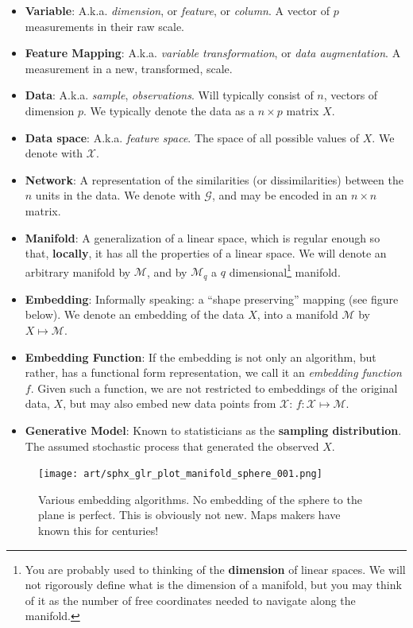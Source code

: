 \documentclass[]{book}
\theoremstyle{definition}
\theoremstyle{definition}
\theoremstyle{definition}
\theoremstyle{remark}
\begin{document}
\begin{itemize}
\item
  \textbf{Variable}:
  A.k.a. \emph{dimension}, or \emph{feature}, or \emph{column}. A vector of \(p\) measurements in their raw scale.
\item
  \textbf{Feature Mapping}:
  A.k.a. \emph{variable transformation}, or \emph{data augmentation}. A measurement in a new, transformed, scale.
\item
  \textbf{Data}:
  A.k.a. \emph{sample}, \emph{observations}.
  Will typically consist of \(n\), vectors of dimension \(p\).
  We typically denote the data as a \(n\times p\) matrix \(X\).
\item
  \textbf{Data space}:
  A.k.a. \emph{feature space}. The space of all possible values of \(X\). We denote with \(\mathcal{X}\).
\item
  \textbf{Network}:
  A representation of the similarities (or dissimilarities) between the \(n\) units in the data. We denote with \(\mathcal{G}\), and may be encoded in an \(n \times n\) matrix.
\item
  \textbf{Manifold}:
  A generalization of a linear space, which is regular enough so that, \textbf{locally}, it has all the properties of a linear space.
  We will denote an arbitrary manifold by \(\mathcal{M}\), and by \(\mathcal{M}_q\) a \(q\) dimensional\footnote{You are probably used to thinking of the \textbf{dimension} of linear spaces. We will not rigorously define what is the dimension of a manifold, but you may think of it as the number of free coordinates needed to navigate along the manifold.} manifold.
\item
  \textbf{Embedding}:
  Informally speaking: a ``shape preserving'' mapping (see figure below). We denote an embedding of the data \(X\), into a manifold \(\mathcal{M}\) by \(X\mapsto \mathcal{M}\).
\item
  \textbf{Embedding Function}:
  If the embedding is not only an algorithm, but rather, has a functional form representation, we call it an \emph{embedding function} \(f\). Given such a function, we are not restricted to embeddings of the original data, \(X\), but may also embed new data points from \(\mathcal{X}\): \(f:\mathcal{X}\mapsto\mathcal{M}\).
\item
  \textbf{Generative Model}:
  Known to statisticians as the \textbf{sampling distribution}.
  The assumed stochastic process that generated the observed \(X\).
\end{itemize}

\begin{figure}
\centering
\texttt{[image: art/sphx\_glr\_plot\_manifold\_sphere\_001.png]}
\caption{Various embedding algorithms. No embedding of the sphere to the plane is perfect. This is obviously not new. Maps makers have known this for centuries!}
\end{figure}
\end{document}
